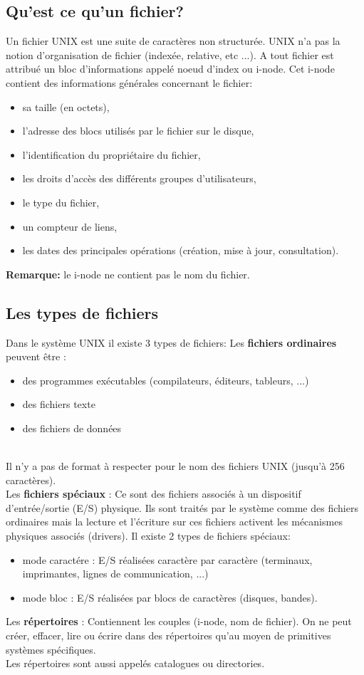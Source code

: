 			\subsection{Qu'est ce qu'un fichier?}
				Un fichier UNIX est une suite de caractères non structurée. UNIX n'a pas la notion d'organisation de fichier (indexée, relative, etc ...). 
				A tout fichier est attribué un bloc d'informations appelé noeud d'index ou i-node. Cet i-node contient des informations générales concernant le fichier: 
				\begin{itemize}
					\item sa taille (en octets),
					\item l'adresse des blocs utilisés par le fichier sur le disque,
					\item l'identification du propriétaire du fichier, 
					\item les droits d'accès des différents groupes d'utilisateurs, 
					\item le type du fichier, 
					\item un compteur de liens, 
					\item les dates des principales opérations (création, mise à jour, consultation).
				\end{itemize}
				\textbf{Remarque:} le i-node ne contient pas le nom du fichier.
			\subsection{Les types de fichiers}
				Dans le système UNIX il existe 3 types de fichiers:
				Les \textbf{fichiers ordinaires} peuvent être :
				\begin{itemize}
					\item des programmes exécutables (compilateurs, éditeurs, tableurs, ...) 
					\item des fichiers texte 
					\item des fichiers de données
				\end{itemize}\\					
				Il n'y a pas de format à respecter pour le nom des fichiers UNIX (jusqu'à 256 caractères).\\
				Les \textbf{fichiers spéciaux} : 
				Ce sont des fichiers associés à un dispositif d'entrée/sortie (E/S) physique. Ils sont traités par le système comme des fichiers ordinaires mais la 	lecture et l'écriture sur ces fichiers activent les mécanismes physiques associés (drivers).
				Il existe 2 types de fichiers spéciaux: 
				\begin{itemize}				
					\item mode caractére : E/S réalisées caractère par caractère (terminaux, imprimantes, lignes de communication, ...)
					\item mode bloc : E/S réalisées par blocs de caractères (disques, bandes).
				\end{itemize}
				Les \textbf{répertoires} : 
				Contiennent les couples (i-node, nom de fichier). On ne peut créer, effacer, lire ou écrire dans des répertoires qu'au moyen de primitives systèmes 	spécifiques.\\ 
				Les répertoires sont aussi appelés catalogues ou directories.
